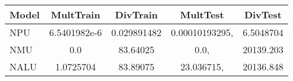 \begin{tabular}{lcccc}
\toprule
Model & MultTrain & DivTrain & MultTest & DivTest\\
\midrule
NPU & 6.5401982e-6 & 0.029891482 & 0.00010193295, & 6.5048704 \\
NMU & 0.0 & 83.64025 & 0.0, & 20139.203 \\
NALU & 1.0725704 & 83.89075 & 23.036715, & 20136.848 \\
\bottomrule
\end{tabular}
